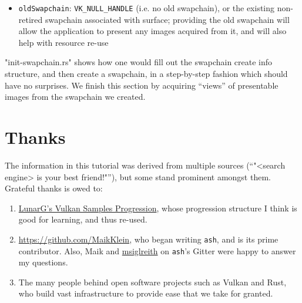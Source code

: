 \documentclass[12pt,letterpaper]{article}
\newcommand{\inquotes}[1]{``#1''}	%
\newcommand{\cil}[1]{\texttt{#1}}
\newcommand{\ash}{\texttt{ash}}
\begin{document}
\begin{itemize}
        \item \cil{oldSwapchain}: \cil{VK_NULL_HANDLE} (i.e. no old swapchain), or the existing non-retired swapchain associated with surface; providing the old swapchain will allow the application to present any images acquired from it, and will also help with resource re-use
    \end{itemize}

    "init-swapchain.rs" shows how one would fill out the swapchain create info structure, and then create a swapchain, in a step-by-step fashion which should have no surprises. We finish this section by acquiring \inquotes{views} of presentable images from the swapchain we created.
    
\section{Thanks}
	The information in this tutorial was derived from multiple sources (\inquotes{"<search engine> is your best friend!"}), but some stand prominent amongst them. Grateful thanks is owed to:
		\begin{enumerate}
			\item \href{https://vulkan.lunarg.com/doc/sdk/1.0.65.1/windows/tutorial/html/index.html}{LunarG's Vulkan Samples Progression}, whose progression structure I think is good for learning, and thus re-used.
			
			\item \href{Maik Klein}{https://github.com/MaikKlein}, who began writing \ash, and is its prime contributor. Also, Maik and \href{https://github.com/msiglreith}{msiglreith} on \ash's Gitter were happy to answer my questions.
			
			\item The many people behind open software projects such as Vulkan and Rust, who build vast infrastructure to provide ease that we take for granted. 
		\end{enumerate}
\printbibliography
\end{document}
